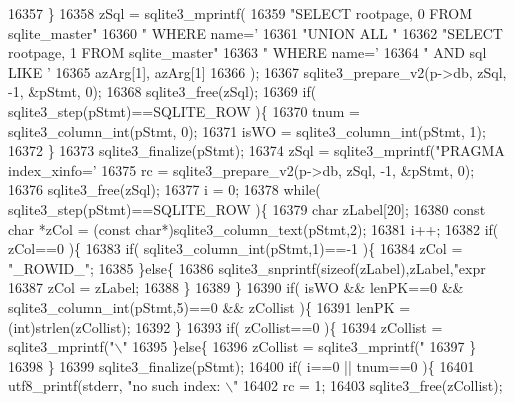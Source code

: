 \begin{DoxyCode}
{{{{{{{{{{{{{{{{{{{{{{{{{{{{{{{{{{{{16357     \}
16358     zSql = sqlite3_mprintf(
16359       \textcolor{stringliteral}{"SELECT rootpage, 0 FROM sqlite\_master"}
16360       \textcolor{stringliteral}{" WHERE name='%
16361       \textcolor{stringliteral}{"UNION ALL "}
16362       \textcolor{stringliteral}{"SELECT rootpage, 1 FROM sqlite\_master"}
16363       \textcolor{stringliteral}{" WHERE name='%
16364       \textcolor{stringliteral}{"   AND sql LIKE '%
16365       azArg[1], azArg[1]
16366     );
16367     sqlite3_prepare_v2(p->db, zSql, -1, &pStmt, 0);
16368     sqlite3_free(zSql);
16369     \textcolor{keywordflow}{if}( sqlite3_step(pStmt)==SQLITE_ROW )\{
16370       tnum = sqlite3_column_int(pStmt, 0);
16371       isWO = sqlite3_column_int(pStmt, 1);
16372     \}
16373     sqlite3_finalize(pStmt);
16374     zSql = sqlite3_mprintf(\textcolor{stringliteral}{"PRAGMA index\_xinfo='%
16375     rc = sqlite3_prepare_v2(p->db, zSql, -1, &pStmt, 0);
16376     sqlite3_free(zSql);
16377     i = 0;
16378     \textcolor{keywordflow}{while}( sqlite3_step(pStmt)==SQLITE_ROW )\{
16379       \textcolor{keywordtype}{char} zLabel[20];
16380       \textcolor{keyword}{const} \textcolor{keywordtype}{char} *zCol = (\textcolor{keyword}{const} \textcolor{keywordtype}{char}*)sqlite3_column_text(pStmt,2);
16381       i++;
16382       \textcolor{keywordflow}{if}( zCol==0 )\{
16383         \textcolor{keywordflow}{if}( sqlite3_column_int(pStmt,1)==-1 )\{
16384           zCol = \textcolor{stringliteral}{"\_ROWID\_"};
16385         \}\textcolor{keywordflow}{else}\{
16386           sqlite3_snprintf(\textcolor{keyword}{sizeof}(zLabel),zLabel,\textcolor{stringliteral}{"expr%
16387           zCol = zLabel;
16388         \}
16389       \}
16390       \textcolor{keywordflow}{if}( isWO && lenPK==0 && sqlite3_column_int(pStmt,5)==0 && zCollist )\{
16391         lenPK = (int)strlen(zCollist);
16392       \}
16393       \textcolor{keywordflow}{if}( zCollist==0 )\{
16394         zCollist = sqlite3_mprintf(\textcolor{stringliteral}{"\(\backslash\)"%
16395       \}\textcolor{keywordflow}{else}\{
16396         zCollist = sqlite3_mprintf(\textcolor{stringliteral}{"%
16397       \}
16398     \}
16399     sqlite3_finalize(pStmt);
16400     \textcolor{keywordflow}{if}( i==0 || tnum==0 )\{
16401       utf8_printf(stderr, \textcolor{stringliteral}{"no such index: \(\backslash\)"%
16402       rc = 1;
16403       sqlite3_free(zCollist);
}}}}}}}}}}}}}}}}}}}}}}}}}}}}}}}}}}}}}}}}}}}}
\end{DoxyCode}

